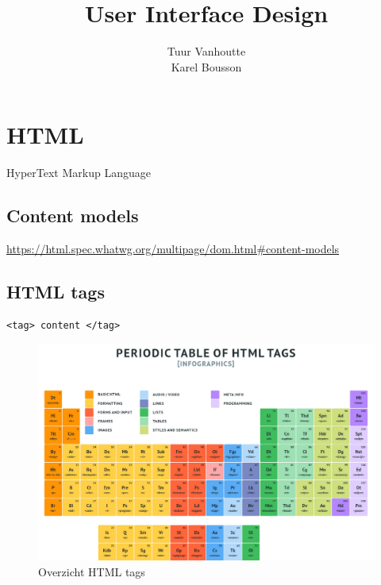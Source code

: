 \documentclass{article}
\begin{document}
\begin{titlepage}
    \author{Tuur Vanhoutte \\
    Karel Bousson}
    \title{User Interface Design}
\end{titlepage}

\maketitle
\newpage
\tableofcontents
\newpage




\section{HTML}
HyperText Markup Language

\subsection{Content models}
\url{https://html.spec.whatwg.org/multipage/dom.html\#content-models}



\subsection{HTML tags}

\begin{lstlisting}
<tag> content </tag>
\end{lstlisting}


\begin{figure}[H]
    \includegraphics[width=\textwidth]{img/Screenshot_20200212_142612.png}
    \caption{Overzicht HTML tags}
\end{figure}
\end{document}
